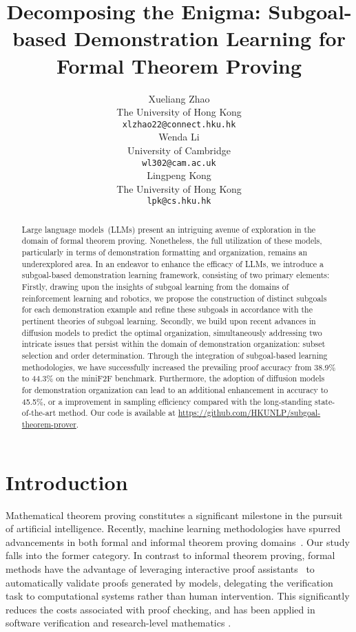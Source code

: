 \documentclass{article}
\title{Decomposing the Enigma: Subgoal-based Demonstration Learning for Formal Theorem Proving}
\author{Xueliang Zhao \\
The University of Hong Kong \\
\texttt{xlzhao22@connect.hku.hk} \\
\And
Wenda Li \\
University of Cambridge \\
\texttt{wl302@cam.ac.uk} \\
\AND
Lingpeng Kong \\
The University of Hong Kong \\
\texttt{lpk@cs.hku.hk} \\
}
\begin{document}
\maketitle


\begin{abstract}
Large language models~(LLMs) present an intriguing avenue of exploration in the domain of formal theorem proving. Nonetheless, the full utilization of these models, particularly in terms of demonstration formatting and organization, remains an underexplored area. In an endeavor to enhance the efficacy of LLMs, we introduce a subgoal-based demonstration learning framework, consisting of two primary elements: Firstly, drawing upon the insights of subgoal learning from the domains of reinforcement learning and robotics, we propose the construction of distinct subgoals for each demonstration example and refine these subgoals in accordance with the pertinent theories of subgoal learning. Secondly, we build upon recent advances in diffusion models to predict the optimal organization, simultaneously addressing two intricate issues that persist within the domain of demonstration organization: subset selection and order determination. Through the integration of subgoal-based learning methodologies, we have successfully increased the prevailing proof accuracy from 38.9\% to 44.3\% on the miniF2F benchmark. Furthermore, the adoption of diffusion models for demonstration organization can lead to an additional enhancement in accuracy to 45.5\%, or a  improvement in sampling efficiency compared with the long-standing state-of-the-art method. Our code is available at \url{https://github.com/HKUNLP/subgoal-theorem-prover}.
\end{abstract}

\section{Introduction}

Mathematical theorem proving constitutes a significant milestone in the pursuit of artificial intelligence. Recently, machine learning methodologies have spurred advancements in both formal and informal theorem proving domains~\cite{polu2020generative,lewkowycz2022solving}. Our study falls into the former category. In contrast to informal theorem proving, formal methods have the advantage of leveraging interactive proof assistants~\cite{paulson2000isabelle} to automatically validate proofs generated by models, delegating the verification task to computational systems rather than human intervention. This significantly reduces the costs associated with proof checking, and has been applied in software verification \cite{klein2009sel4} and research-level mathematics \cite{castelvecchi2021mathematicians}. 
\end{document}
